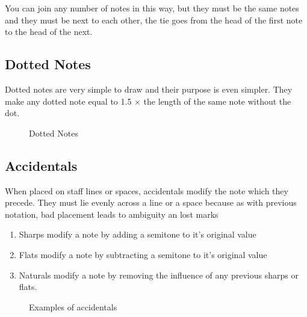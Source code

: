 You can join any number of notes in this way, but they must be the same notes and they must be next to each other, the tie goes from the head of the first note to the head of the next.

\subsection*{Dotted Notes}

Dotted notes are very simple to draw and their purpose is even simpler. They make any dotted note equal to 1.5 $\times$ the length of the same note without the dot.

\begin{figure}[h!]
  \centering
  \caption{Dotted Notes}
  \label{fig:DottedNotes}
\end{figure}

\subsection*{Accidentals}

When placed on staff lines or spaces, accidentals modify the note which they precede. They must lie evenly across a line or a space because as with previous notation, bad placement leads to ambiguity an lost marks

\begin{enumerate}
\item Sharps modify a note by adding a semitone to it's original value
\item Flats modify a note by subtracting a semitone to it's original value
\item Naturals modify a note by removing the influence of any previous sharps or flats.
\end{enumerate}

\begin{figure}[h!]
  \centering
  \caption{Examples of accidentals}
  \label{fig:BassClef}
\end{figure}
